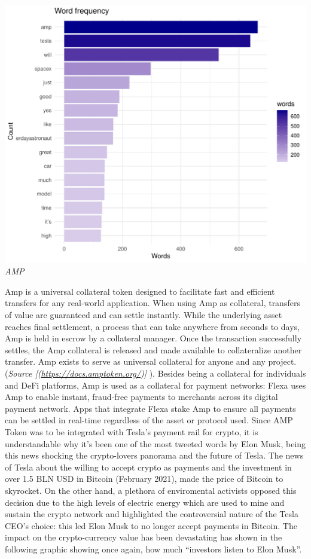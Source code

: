 \documentclass[
]{article}
\begin{document}
\includegraphics{Trial1_files/figure-latex/fig4-1.pdf} \emph{AMP}

Amp is a universal collateral token designed to facilitate fast and
efficient transfers for any real-world application. When using Amp as
collateral, transfers of value are guaranteed and can settle instantly.
While the underlying asset reaches final settlement, a process that can
take anywhere from seconds to days, Amp is held in escrow by a
collateral manager. Once the transaction successfully settles, the Amp
collateral is released and made available to collateralize another
transfer. Amp exists to serve as universal collateral for anyone and any
project. (\emph{Source {[}(\url{https://docs.amptoken.org/}){]}} ).
Besides being a collateral for individuals and DeFi platforms, Amp is
used as a collateral for payment networks: Flexa uses Amp to enable
instant, fraud-free payments to merchants across its digital payment
network. Apps that integrate Flexa stake Amp to ensure all payments can
be settled in real-time regardless of the asset or protocol used. Since
AMP Token was to be integrated with Tesla's payment rail for crypto, it
is understandable why it's been one of the most tweeted words by Elon
Musk, being this news shocking the crypto-lovers panorama and the future
of Tesla. The news of Tesla about the willing to accept crypto as
payments and the investment in over 1.5 BLN USD in Bitcoin (February
2021), made the price of Bitcoin to skyrocket. On the other hand, a
plethora of enviromental activists opposed this decision due to the high
levels of electric energy which are used to mine and sustain the crypto
network and highlighted the controversial nature of the Tesla CEO's
choice: this led Elon Musk to no longer accept payments in Bitcoin. The
impact on the crypto-currency value has been devastating has shown in
the following graphic showing once again, how much ``investors listen to
Elon Musk''.
\end{document}
